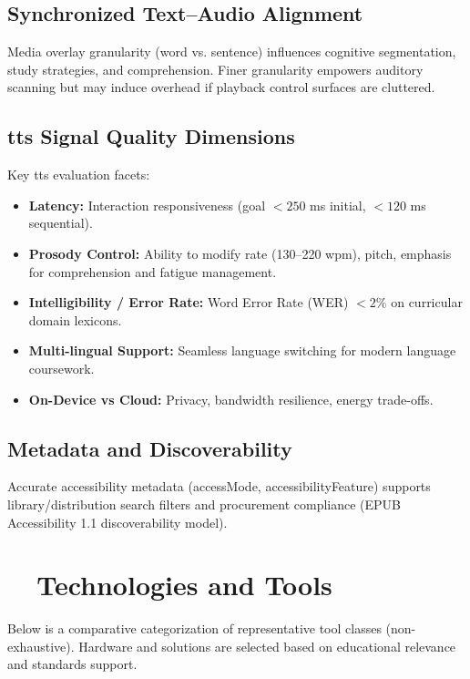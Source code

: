 \subsection{Synchronized Text–Audio Alignment}
Media overlay granularity (word vs. sentence) influences cognitive segmentation, study strategies,
and comprehension. Finer granularity empowers auditory scanning but may induce overhead if
playback control surfaces are cluttered.

\subsection{\gls{tts} Signal Quality Dimensions}
Key \gls{tts} evaluation facets:
\begin{itemize}
	\item \textbf{Latency:} Interaction responsiveness (goal $< 250$ ms initial, $< 120$ ms sequential).
	\item \textbf{Prosody Control:} Ability to modify rate (130–220 wpm), pitch, emphasis for
	      comprehension and fatigue management.
	\item \textbf{Intelligibility / Error Rate:} Word Error Rate (WER) $< 2\%$ on curricular domain lexicons.
	\item \textbf{Multi-lingual Support:} Seamless language switching for modern language coursework.
	\item \textbf{On-Device vs Cloud:} Privacy, bandwidth resilience, energy trade-offs.
\end{itemize}

\subsection{Metadata and Discoverability}
Accurate accessibility metadata (accessMode, accessibilityFeature) supports library/distribution
search filters and procurement compliance (EPUB Accessibility 1.1 discoverability model).

\section{~~Technologies and Tools}\label{ch07:sec:technologies-tools}
Below is a comparative categorization of representative tool classes (non-exhaustive). Hardware
and  solutions are selected based on educational relevance and standards support.

